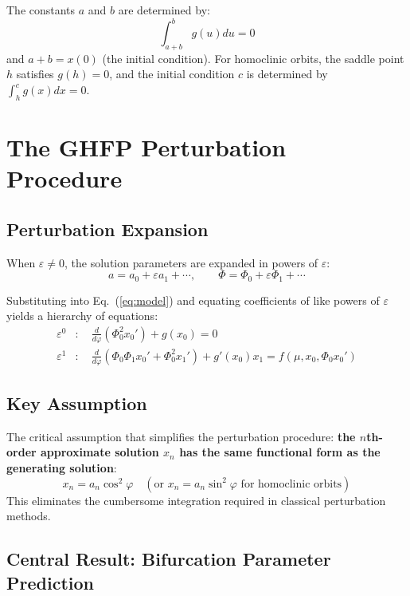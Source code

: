 \documentclass[11pt,a4paper]{article}
\begin{document}
The constants $a$ and $b$ are determined by:
\begin{equation}
\int_{a+b}^b g(u)du = 0
\label{eq:constants}
\end{equation}
and $a+b = x(0)$ (the initial condition). For homoclinic orbits, the saddle point $h$ satisfies $g(h)=0$, and the initial condition $c$ is determined by $\int_h^c g(x)dx = 0$.

\section{The GHFP Perturbation Procedure}

\subsection{Perturbation Expansion}

When $\varepsilon \neq 0$, the solution parameters are expanded in powers of $\varepsilon$:
\begin{equation}
a = a_0 + \varepsilon a_1 + \cdots, \qquad \Phi = \Phi_0 + \varepsilon \Phi_1 + \cdots
\label{eq:expansion}
\end{equation}

Substituting into Eq.~(\ref{eq:model}) and equating coefficients of like powers of $\varepsilon$ yields a hierarchy of equations:
\begin{align}
\varepsilon^0&: \quad \frac{d}{d\varphi}(\Phi_0^2 x_0') + g(x_0) = 0 \\
\varepsilon^1&: \quad \frac{d}{d\varphi}(\Phi_0\Phi_1 x_0' + \Phi_0^2 x_1') + g'(x_0)x_1 = f(\mu, x_0, \Phi_0 x_0')
\end{align}

\subsection{Key Assumption}

The critical assumption that simplifies the perturbation procedure: \textbf{the $n$th-order approximate solution $x_n$ has the same functional form as the generating solution}:
\begin{equation}
x_n = a_n \cos^2\varphi \quad (\text{or } x_n = a_n \sin^2\varphi \text{ for homoclinic orbits})
\label{eq:assumption}
\end{equation}
This eliminates the cumbersome integration required in classical perturbation methods.

\subsection{Central Result: Bifurcation Parameter Prediction}
\end{document}
